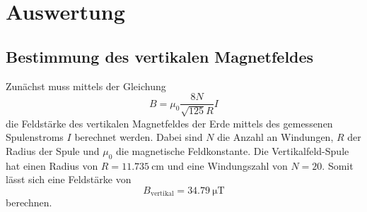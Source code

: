 \section{Auswertung}
\label{sec:Auswertung}
\subsection{Bestimmung des vertikalen Magnetfeldes}
Zunächst muss mittels der Gleichung
\begin{equation*}
    B = \mu_0 \frac{8N}{\sqrt{125}R}I
\end{equation*} 
die Feldstärke des vertikalen Magnetfeldes der Erde mittels des gemessenen Spulenstroms $I$ berechnet werden. \cite{leifi}
Dabei sind $N$ die Anzahl an Windungen, $R$ der Radius der Spule und $\mu_0$ die magnetische Feldkonstante.
Die Vertikalfeld-Spule hat einen Radius von $R = \qty{11.735}{\centi\metre}$ und eine Windungszahl von $N = 20$.\cite{sample}
Somit lässt sich eine Feldstärke von 
\begin{equation*}
    B_{\text{vertikal}} = \qty{34.79}{\micro\tesla}
\end{equation*}
berechnen.
